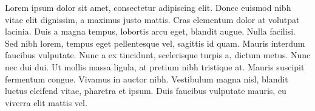 \documentclass{article}
\begin{document}
Lorem ipsum dolor sit amet, consectetur adipiscing elit.
Donec euismod nibh vitae elit dignissim, a maximus justo mattis.
Cras elementum dolor at volutpat lacinia.
Duis a magna tempus, lobortis arcu eget, blandit augue.
Nulla facilisi.
Sed nibh lorem, tempus eget pellentesque vel, sagittis id quam.
Mauris interdum faucibus vulputate.
Nunc a ex tincidunt, scelerisque turpis a, dictum metus.
Nunc nec dui dui.
Ut mollis massa ligula, at pretium nibh tristique at.
Mauris suscipit fermentum congue.
Vivamus in auctor nibh.
Vestibulum magna nisl, blandit luctus eleifend vitae, pharetra et ipsum.
Duis faucibus vulputate mauris, eu viverra elit mattis vel.





\end{document}
